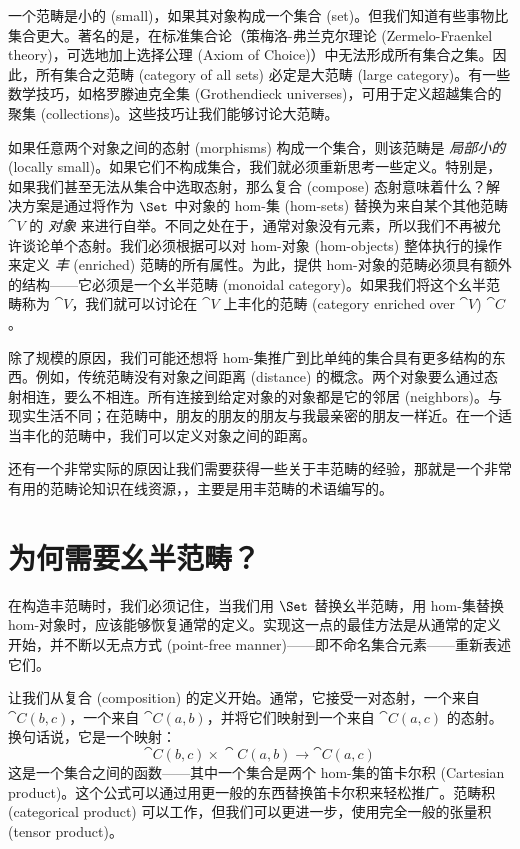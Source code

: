 
\lettrine[lhang=0.17]{一}{个范畴是小的} (small)，如果其对象构成一个集合 (set)。但我们知道有些事物比集合更大。著名的是，在标准集合论（策梅洛-弗兰克尔理论 (Zermelo-Fraenkel theory)，可选地加上选择公理 (Axiom of Choice)）中无法形成所有集合之集。因此，所有集合之范畴 (category of all sets) 必定是大范畴 (large category)。有一些数学技巧，如格罗滕迪克全集 (Grothendieck universes)，可用于定义超越集合的聚集 (collections)。这些技巧让我们能够讨论大范畴。

如果任意两个对象之间的态射 (morphisms) 构成一个集合，则该范畴是 \emph{局部小的} (locally small)。如果它们不构成集合，我们就必须重新思考一些定义。特别是，如果我们甚至无法从集合中选取态射，那么复合 (compose) 态射意味着什么？解决方案是通过将作为 $\Set$ 中对象的 hom-集 (hom-sets) 替换为来自某个其他范畴 $\cat{V}$ 的 \emph{对象} 来进行自举。不同之处在于，通常对象没有元素，所以我们不再被允许谈论单个态射。我们必须根据可以对 hom-对象 (hom-objects) 整体执行的操作来定义 \emph{丰} (enriched) 范畴的所有属性。为此，提供 hom-对象的范畴必须具有额外的结构——它必须是一个幺半范畴 (monoidal category)。如果我们将这个幺半范畴称为 $\cat{V}$，我们就可以讨论在 $\cat{V}$ 上丰化的范畴 (category enriched over $\cat{V}$) $\cat{C}$。

除了规模的原因，我们可能还想将 hom-集推广到比单纯的集合具有更多结构的东西。例如，传统范畴没有对象之间距离 (distance) 的概念。两个对象要么通过态射相连，要么不相连。所有连接到给定对象的对象都是它的邻居 (neighbors)。与现实生活不同；在范畴中，朋友的朋友的朋友与我最亲密的朋友一样近。在一个适当丰化的范畴中，我们可以定义对象之间的距离。

还有一个非常实际的原因让我们需要获得一些关于丰范畴的经验，那就是一个非常有用的范畴论知识在线资源，，主要是用丰范畴的术语编写的。

\section{为何需要幺半范畴？}

在构造丰范畴时，我们必须记住，当我们用 $\Set$ 替换幺半范畴，用 hom-集替换 hom-对象时，应该能够恢复通常的定义。实现这一点的最佳方法是从通常的定义开始，并不断以无点方式 (point-free manner)——即不命名集合元素——重新表述它们。

让我们从复合 (composition) 的定义开始。通常，它接受一对态射，一个来自 $\cat{C}(b, c)$，一个来自 $\cat{C}(a, b)$，并将它们映射到一个来自 $\cat{C}(a, c)$ 的态射。换句话说，它是一个映射：
\[\cat{C}(b, c)\times{}\cat{C}(a, b) \to \cat{C}(a, c)\]
这是一个集合之间的函数——其中一个集合是两个 hom-集的笛卡尔积 (Cartesian product)。这个公式可以通过用更一般的东西替换笛卡尔积来轻松推广。范畴积 (categorical product) 可以工作，但我们可以更进一步，使用完全一般的张量积 (tensor product)。

